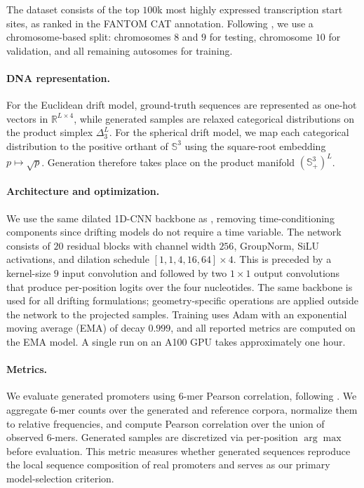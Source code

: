 \documentclass{article}
\theoremstyle{plain}
\begin{document}
The dataset consists of the top $100$k most highly expressed transcription start sites, as ranked in the FANTOM CAT annotation. Following \citet{Woo_2026_RMeanFlow}, we use a chromosome-based split: chromosomes $8$ and $9$ for testing, chromosome $10$ for validation, and all remaining autosomes for training.

\paragraph{DNA representation.}
For the Euclidean drift model, ground-truth sequences are represented as one-hot vectors in $\mathbb{R}^{L \times 4}$, while generated samples are relaxed categorical distributions on the product simplex $\Delta_3^L$. For the spherical drift model, we map each categorical distribution to the positive orthant of $\mathbb{S}^3$ using the square-root embedding $p \mapsto \sqrt{p}$. Generation therefore takes place on the product manifold $(\mathbb{S}^3_+)^L$.

\paragraph{Architecture and optimization.}
We use the same dilated 1D-CNN backbone as \citet{Woo_2026_RMeanFlow}, removing time-conditioning components since drifting models do not require a time variable. The network consists of $20$ residual blocks with channel width $256$, GroupNorm, SiLU activations, and dilation schedule $[1,1,4,16,64]\times 4$. This is preceded by a kernel-size $9$ input convolution and followed by two $1{\times}1$ output convolutions that produce per-position logits over the four nucleotides. The same backbone is used for all drifting formulations; geometry-specific operations are applied outside the network to the projected samples. Training uses Adam with an exponential moving average (EMA) of decay $0.999$, and all reported metrics are computed on the EMA model. A single run on an A100 GPU takes approximately one hour.

\paragraph{Metrics.}
We evaluate generated promoters using $6$-mer Pearson correlation, following \citet{avdeyev2023dirichletdiffusionscoremodel}. We aggregate $6$-mer counts over the generated and reference corpora, normalize them to relative frequencies, and compute Pearson correlation over the union of observed $6$-mers. Generated samples are discretized via per-position $\arg\max$ before evaluation. This metric measures whether generated sequences reproduce the local sequence composition of real promoters and serves as our primary model-selection criterion.
\end{document}
